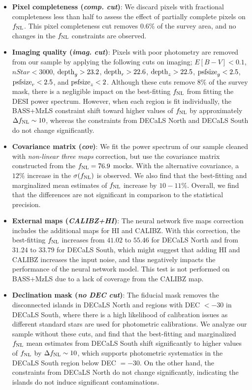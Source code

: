 \begin{itemize}[itemindent=*]
\item \textbf{Pixel completeness (\textit{comp. cut})}: We discard pixels with fractional completeness less than half to assess the effect of partially complete pixels on $f_{\rm NL}$. This pixel completeness cut removes $0.6\%$ of the survey area, and no changes in the $f_{\rm NL}$ constraints are observed.

\item \textbf{Imaging quality (\textit{imag. cut})}: Pixels with poor photometry are removed from our sample by applying the following cuts on imaging; $E[B-V]<0.1$, $nStar < 3000$, ${\rm depth}_{g} > 23.2$, ${\rm depth}_{r} > 22.6$, ${\rm depth}_{z} > 22.5$, ${\rm psfsize}_{g}<2.5$, ${\rm psfsize}_{r}<2.5$, and ${\rm psfsize}_{z}<2$. Although these cuts remove $8\%$ of the survey mask, there is a negligible impact on the best-fitting $f_{\rm NL}$ from fitting the DESI power spectrum. However, when each region is fit individually, the BASS+MzLS constraint shift toward higher values of $f_{\rm NL}$ by approximately $\Delta f_{\rm NL} \sim 10$, whereas the constraints from DECaLS North and DECaLS South do not change significantly. 

\item \textbf{Covariance matrix (\textit{cov})}: We fit the power spectrum of our sample cleaned with \textit{non-linear three maps} correction, but use the covariance matrix constructed from the $f_{\rm NL}=76.9$ mocks. With the alternative covariance, a $12\%$ increase in the $\sigma(f_{\rm NL})$ is observed. We also find that the best-fitting and marginalized mean estimates of $f_{\rm NL}$ increase by $10-11\%$. Overall, we find that the differences are not significant in comparison to the statistical precision.

\item \textbf{External maps (\textit{CALIBZ+HI})}: The neural network five maps correction includes the additional maps for HI and CALIBZ. With this correction, the best-fitting $f_{\rm NL}$ increases from $41.02$ to $55.46$ for DECaLS North and from $31.24$ to $33.79$ for DECaLS South, which might suggest that adding HI and CALIBZ increases the input noise, and thus negatively impacts the performance of the neural network model. This test is not performed on BASS+MzLS due to a lack of coverage from the CALIBZ map. 

\item \textbf{Declination mask (\textit{no DEC cut})}: The fiducial mask removes the disconnected islands in DECaLS North and regions with DEC $<-30$ in DECaLS South, where there is a high likelihood of calibration issues as different standard stars are used for photometric calibrations. We analyze our sample without these cuts, and find that the best-fitting and marginalized $f_{\rm NL}$ mean estimates from DECaLS South shift significantly to higher values of $f_{\rm NL}$ by $\Delta f_{\rm NL} \sim 10$, which supports  photometric systematics in the DECaLS South region below DEC $=-30$. On the other hand, the constraints from DECaLS North do not change significantly, indicating the islands do not induce significant contaminations.


\end{itemize}
